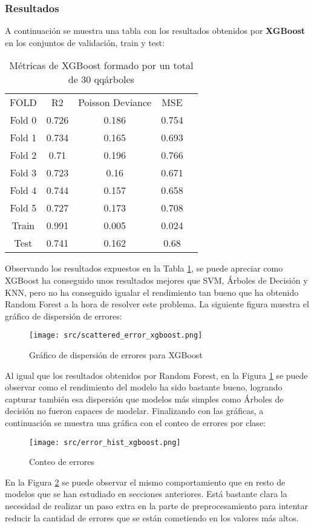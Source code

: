 \subsubsection*{Resultados}
A continuación se muestra una tabla con los resultados obtenidos por \textbf{XGBoost} en los conjuntos de validación, train y test:
\begin{table}[H]
	\centering
	\begin{tabular}{|c|c|c|c|c|}
		\cline{1-4}
		FOLD   & R2    & Poisson Deviance & MSE   \\ \cline{1-4}
		Fold 0 & 0.726 & 0.186            & 0.754 \\ \cline{1-4}
		Fold 1 & 0.734 & 0.165            & 0.693 \\ \cline{1-4}
		Fold 2 & 0.71  & 0.196            & 0.766 \\ \cline{1-4}
		Fold 3 & 0.723 & 0.16             & 0.671 \\ \cline{1-4}
		Fold 4 & 0.744 & 0.157            & 0.658 \\ \cline{1-4}
		Fold 5 & 0.727 & 0.173            & 0.708 \\ \cline{1-4}
		Train  & 0.991 & 0.005            & 0.024 \\ \cline{1-4}
		Test   & 0.741 & 0.162            & 0.68  \\ \cline{1-4}
	\end{tabular}
	\caption{Métricas de XGBoost formado por un total de 30 qqárboles}
	\label{tab:xgboost}
\end{table}
Observando los resultados expuestos en la Tabla \ref{tab:xgboost}, se puede apreciar como XGBoost ha conseguido unos resultados mejores que SVM, Árboles de Decisión y KNN, pero no ha conseguido igualar el rendimiento tan bueno que ha obtenido Random Forest a la hora de resolver este problema.
\clearpage
La siguiente figura muestra el gráfico de dispersión de errores:
\begin{figure}[H]
	\centering
	\texttt{[image: src/scattered\_error\_xgboost.png]}
	\caption{Gráfico de dispersión de errores para XGBoost}
	\label{fig:xgboost_scattered}
\end{figure}
Al igual que los resultados obtenidos por Random Forest, en la Figura \ref{fig:xgboost_scattered} se puede observar como el rendimiento del modelo ha sido bastante bueno, logrando capturar también esa dispersión que modelos más simples como Árboles de decisión no fueron capaces de modelar.
\clearpage
Finalizando con las gráficas, a continuación se muestra una gráfica con el conteo de errores por clase:
\begin{figure}[H]
	\centering
	\texttt{[image: src/error\_hist\_xgboost.png]}
	\caption{Conteo de errores}
	\label{fig:xgboost_error_plot}
\end{figure}
En la Figura \ref{fig:xgboost_error_plot} se puede observar el mismo comportamiento que en resto de modelos que se han estudiado en secciones anteriores. Está bastante clara la necesidad de realizar un paso extra en la parte de preprocesamiento para intentar reducir la cantidad de errores que se están cometiendo en los valores más altos.
\clearpage
